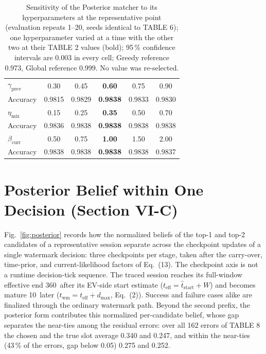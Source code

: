 \documentclass[10pt]{article}
\newcommand{\sq}{\,\text{s}}
\begin{document}
\begin{table}[h]
\centering
\caption{Sensitivity of the Posterior matcher to its hyperparameters at the representative point (evaluation repeats 1--20, seeds identical to TABLE 6); one hyperparameter varied at a time with the other two at their TABLE 2 values (bold); 95\,\% confidence intervals are 0.003 in every cell; Greedy reference 0.973, Global reference 0.999. No value was re-selected.}
\label{tab:hyper}
\small
\begin{tabular}{@{}lccccc@{}}
\toprule
$\gamma_{\text{prev}}$ & 0.30 & 0.45 & \textbf{0.60} & 0.75 & 0.90 \\
Accuracy & 0.9815 & 0.9829 & \textbf{0.9838} & 0.9833 & 0.9830 \\
\midrule
$\eta_{\text{mix}}$ & 0.15 & 0.25 & \textbf{0.35} & 0.50 & 0.70 \\
Accuracy & 0.9836 & 0.9838 & \textbf{0.9838} & 0.9838 & 0.9838 \\
\midrule
$\beta_{\text{curr}}$ & 0.50 & 0.75 & \textbf{1.00} & 1.50 & 2.00 \\
Accuracy & 0.9838 & 0.9838 & \textbf{0.9838} & 0.9838 & 0.9837 \\
\bottomrule
\end{tabular}
\end{table}

\section{Posterior Belief within One Decision (Section VI-C)}

Fig.~\ref{fig:posterior} records how the normalized beliefs of the top-1 and top-2 candidates of a representative session separate across the checkpoint updates of a single watermark decision: three checkpoints per stage, taken after the carry-over, time-prior, and current-likelihood factors of Eq.~(13). The checkpoint axis is not a runtime decision-tick sequence. The traced session reaches its full-window effective end 360\sq{} after its EV-side start estimate ($t_{\text{eff}} = \hat{t}_{\text{start}} + W$) and becomes mature 10\sq{} later ($t_{\text{wm}} = t_{\text{eff}} + d_{\max}$, Eq.~(2)). Success and failure cases alike are finalized through the ordinary watermark path. Beyond the second prefix, the posterior form contributes this normalized per-candidate belief, whose gap separates the near-ties among the residual errors: over all 162 errors of TABLE 8 the chosen and the true slot average 0.340 and 0.247, and within the near-ties (43\,\% of the errors, gap below 0.05) 0.275 and 0.252.
\end{document}

